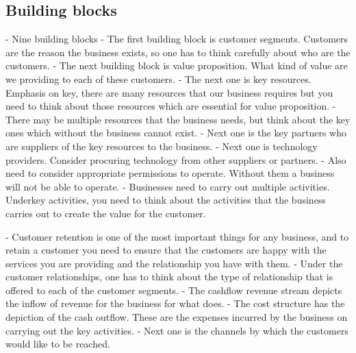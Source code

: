 \subsection{Building blocks}
- Nine building blocks
- The first building block is customer segments. Customers are the reason the business exists, so one has to think carefully about who are the customers.
- The next building block is value proposition. What kind of value are we providing to each of these customers.
- The next one is key resources. Emphasis on key, there are many resources that our business requires but you need to think about those resources which are essential for value proposition.
- There may be multiple resources that the business needs, but think about the key ones which without the business cannot exist.
- Next one is the key partners who are suppliers of the key resources to the business.
- Next one is technology providers. Consider procuring technology from other suppliers or partners.
- Also need to consider appropriate permissions to operate. Without them a business will not be able to operate.
- Businesses need to carry out multiple activities. Underkey activities, you need to think about the activities that the business carries out to create the value for the customer.

- Customer retention is one of the most important things for any business, and to retain a customer you need to ensure that the customers are happy with the services you are providing and the relationship you have with them.
- Under the customer relationships, one has to think about the type of relationship that is offered to each of the customer segments.
- The cashflow revenue stream depicts the inflow of revenue for the business for what does.
- The cost structure has the depiction of the cash outflow. These are the expenses incurred by the business on carrying out the key activities.
- Next one is the channels by which the customers would like to be reached.

